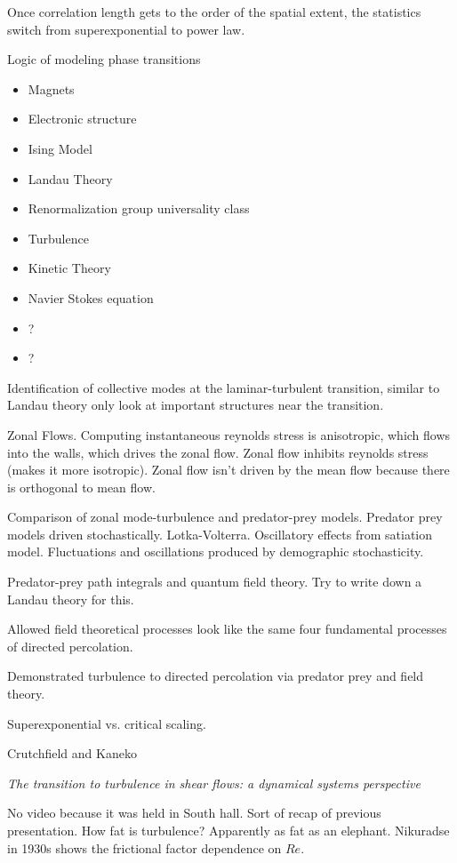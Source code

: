 \begin{description}
{\begin{description}
Once correlation length gets to the order of the spatial extent, the
statistics switch from superexponential to power law.

Logic of modeling phase transitions
\begin{itemize}
\item Magnets
\item Electronic structure
\item Ising Model
\item Landau Theory
\item Renormalization group universality class

\item Turbulence
\item Kinetic Theory
\item Navier Stokes equation
\item ?
\item ?
\end{itemize}

Identification of collective modes at the laminar-turbulent transition,
similar to Landau theory only look at important structures near the
transition.

Zonal Flows. Computing instantaneous reynolds stress is anisotropic,
which flows into the walls, which drives the zonal flow. Zonal flow
inhibits reynolds stress (makes it more isotropic). Zonal flow isn't
driven by the mean flow because there is orthogonal to mean flow.

Comparison of zonal mode-turbulence and predator-prey models. Predator
prey models driven stochastically. Lotka-Volterra. Oscillatory effects
from satiation model. Fluctuations and oscillations produced by
demographic stochasticity.

Predator-prey path integrals and quantum field theory. Try to write
down a Landau theory for this.

Allowed field theoretical processes look like the same four fundamental
processes of directed percolation.

Demonstrated turbulence to directed percolation via predator prey and field
theory.

Superexponential vs. critical scaling.

Crutchfield and Kaneko

\item[B. Eckhardt Secret]
\textit{The transition to turbulence in shear flows: a dynamical systems perspective}

No video because it was held in South hall.
Sort of recap of previous presentation.
How fat is turbulence? Apparently as fat as an elephant.
Nikuradse in 1930s shows the frictional factor dependence on $Re$.


\end{description}}
\end{description}
